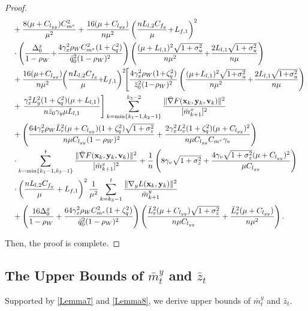 \documentclass{article}
\theoremstyle{plain}
\theoremstyle{definition}
\theoremstyle{remark}
\begin{document}
\begin{proof}
\begin{align}
&\quad+ \frac{8(\mu + C_{l_{yy}})C_{m^v}^2}{\mu^2}+ \frac{16(\mu + C_{l_{yy}})}{n\mu^2}\left(\frac{nL_{l,2}C_{f_y}}{\mu}\!+\!L_{f,1}\right)^2\nonumber\\
&\quad \cdot \left(\frac{\Delta_0^x}{1-\rho_W}\!+\!\frac{4 \gamma_x^2 \rho_WC_{m^x}^2 (1 + \zeta_q^2)}{\bar{q}_0^2(1 - \rho_W)^2} \right)\left(\frac{(\mu+L_{l,1})^2\sqrt{1+\sigma_u^2}}{n\mu^2 }\!+\!\frac{2L_{l,1}\sqrt{1+\sigma_u^2}}{n\mu }\right)\notag \\
&\quad+\frac{16(\mu\! +\! C_{l_{yy}})}{n\mu^2}\!\!\left(\frac{nL_{l,2}C_{f_y}}{\mu}\!\!+\!\!L_{f,1}\right)^2\!\!\left[\frac{4 \gamma_x^2 \rho_W (1 \!+\! \zeta_q^2)}{\bar{z}_0^2(1 \!-\! \rho_W)^2} \left(\frac{(\mu\!+\!L_{l,1})^2\sqrt{1\!+\!\sigma_u^2}}{n\mu^2 }\!+\!\frac{2L_{l,1}\sqrt{1\!+\!\sigma_u^2}}{n\mu }\right)\right.\nonumber\\
&\quad +\left.\frac{\gamma_x^2L_y^2(1+\zeta_q^2)(\mu + L_{l,1})}{n\bar{z}_0\gamma_y \mu L_{l,1}}\right]\sum_{k=\min\{k_1-1,k_2-1\}}^{k_3-2} 
 \frac{\| \bar{\nabla} F(\mathbf{x}_{k},\mathbf{y}_{k},\mathbf{v}_{k})\|^2}{[\bar{m}^x_{k+1}]^2}\nonumber\\
&\quad+ \left(\frac{64 \gamma_x^2 \rho_W \bar{L}_r^2(\mu + C_{l_{yy}})(1 + \zeta_q^2)\sqrt{1+\sigma_z^2}}{n\mu C_{l_{yy}}(1 - \rho_W)^2} + \frac{2\gamma_x^2L_v^2(1+\zeta_q^2)(\mu + C_{l_{yy}})^2}{n\mu C_{l_{yy}}C_{m^v}\gamma_v}\right)\nonumber\\
&\quad\cdot\sum_{k=\min\{k_1-1,k_3-1\}}^{t} 
 \frac{\| \bar{\nabla} F(\mathbf{x}_{k},\mathbf{y}_{k},\mathbf{v}_{k})\|^2}{[\bar{m}^x_{k+1}]^2}+ \frac{1}{n}\left(8\gamma_v\sqrt{1+\sigma_z^2}+\frac{4\gamma_v\sqrt{1+\sigma_z^2}(\mu + C_{l_{yy}})^2}{\mu C_{l_{yy}}} \right)\nonumber\\
&\quad \cdot\left(\frac{nL_{l,2}C_{f_y}}{\mu}+L_{f,1}\right)^2 \frac{1}{\mu^2}\sum_{k=k_3-1}^t\frac{\|\nabla_y L(\mathbf{x}_k,\mathbf{y}_k)\|^2}{\bar{m}_{k+1}^y}\nonumber\\
&\quad +\left(\frac{16\Delta_0^x}{1-\rho_W}+\frac{64\gamma_x^2\rho_WC_{m^x}^2(1+\zeta_q^2)}{\bar{q}_0^2(1-\rho_W)^2}\right)\left(\frac{ \bar{L}_r^2(\mu + C_{l_{yy}})\sqrt{1+\sigma_z^2}}{n\mu C_{l_{yy}}}+\frac{\bar{L}_r^2(\mu+C_{l_{yy}})}{n\mu^2}\right).\label{eq80}
\end{align}

Then, the proof is complete.
\end{proof}

\subsection{The Upper Bounds of $\bar{m}^y_t$ and $\bar{z}_t$}
Supported by \cref{Lemma7} and \cref{Lemma8}, we derive upper bounds of $\bar{m}^y_t$ and $\bar{z}_t$.
\end{document}
